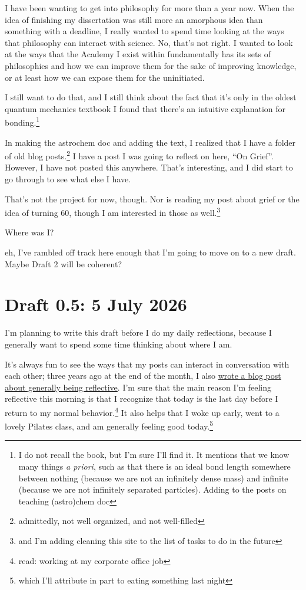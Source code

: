 \documentclass[12pt]{article}
\newcommand{\say}[1]{``#1''}
\renewcommand{\,}{\textsuperscript{,}}
\begin{document}
I have been wanting to get into philosophy for more than a year now.  
When the idea of finishing my dissertation was still more an amorphous idea than something with a deadline, I really wanted to spend time looking at the ways that philosophy can interact with science.  
No, that's not right.  
I wanted to look at the ways that the Academy I exist within fundamentally has its sets of philosophies and how we can improve them for the sake of improving knowledge, or at least how we can expose them for the uninitiated.

I still want to do that, and I still think about the fact that it's only in the oldest quantum mechanics textbook I found that there's an intuitive explanation for bonding.\footnote{I do not recall the book, but I'm sure I'll find it. It mentions that we know many things \textit{a priori}, such as that there is an ideal bond length somewhere between nothing (because we are not an infinitely dense mass) and infinite (because we are not infinitely separated particles). Adding to the posts on teaching (astro)chem doc}

In making the astrochem doc and adding the text, I realized that I have a folder of old blog posts.\footnote{admittedly, not well organized, and not well-filled}  
I have a post I was going to reflect on here, \say{On Grief}.  
However, I have not posted this anywhere.  
That's interesting, and I did start to go through to see what else I have.

That's not the project for now, though.  
Nor is reading my post about grief or the idea of turning 60, though I am interested in those as well.\footnote{and I'm adding cleaning this site to the list of tasks to do in the future}

Where was I?

eh, I've rambled off track here enough that I'm going to move on to a new draft.   
Maybe Draft 2 will be coherent?

\section{Draft 0.5: 5 July 2026}

I'm planning to write this draft before I do my daily reflections, because I generally want to spend some time thinking about where I am.

It's always fun to see the ways that my posts can interact in conversation with each other; three years ago at the end of the month, I also \href{reflection.html}{wrote a blog post about generally being reflective}.  
I'm sure that the main reason I'm feeling reflective this morning is that I recognize that today is the last day before I return to my normal behavior.\footnote{read: working at my corporate office job}  
It also helps that I woke up early, went to a lovely Pilates class, and am generally feeling good today.\footnote{which I'll attribute in part to eating something last night}
\end{document}
